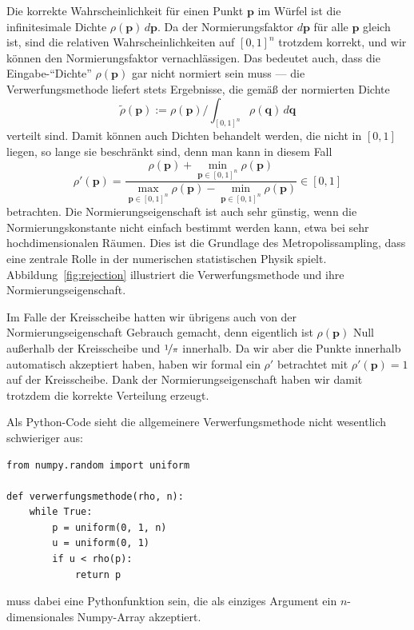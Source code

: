 Die korrekte Wahrscheinlichkeit für einen Punkt $\mathbf p$ im Würfel
ist die infinitesimale Dichte $\rho(\mathbf p)\,d\mathbf p$. Da der
Normierungsfaktor $d\mathbf p$ für alle $\mathbf p$ gleich ist, sind
die relativen Wahrscheinlichkeiten auf $[0,1]^n$ trotzdem korrekt, und
wir können den Normierungsfaktor vernachlässigen. Das bedeutet auch,
dass die Eingabe-"`Dichte"' $\rho(\mathbf p)$ gar nicht normiert sein
muss --- die Verwerfungsmethode liefert stets Ergebnisse, die gemäß
der normierten Dichte
\begin{equation}
  \tilde\rho(\mathbf p) := \rho(\mathbf p) / \int_{[0,1]^n} \rho(\mathbf q)\,d\mathbf q
\end{equation}
verteilt sind. Damit können auch Dichten behandelt werden, die nicht
in $[0,1]$ liegen, so lange sie beschränkt sind, denn man kann in
diesem Fall
\begin{equation}
  \rho'(\mathbf p) = \frac{\rho(\mathbf p) + \min_{\mathbf p\in [0,1]^n} \rho(\mathbf p)}{
    \max_{\mathbf p\in [0,1]^n} \rho(\mathbf p) - \min_{\mathbf p\in [0,1]^n} \rho(\mathbf p)} \in [0,1]
\end{equation}
betrachten. Die Normierungseigenschaft ist auch sehr günstig, wenn die
Normierungskonstante nicht einfach bestimmt werden kann, etwa bei sehr
hochdimensionalen Räumen. Dies ist die Grundlage des
Metropolissampling, dass eine zentrale Rolle in der numerischen
statistischen Physik spielt. Abbildung~\ref{fig:rejection} illustriert
die Verwerfungsmethode und ihre Normierungseigenschaft.

Im Falle der Kreisscheibe hatten wir übrigens auch von der
Normierungseigenschaft Gebrauch gemacht, denn eigentlich ist $\rho(\mathbf p)$
Null außerhalb der Kreisscheibe und $\nicefrac{1}{\pi}$ innerhalb. Da
wir aber die Punkte innerhalb automatisch akzeptiert haben, haben wir
formal ein $\rho'$ betrachtet mit $\rho'(\mathbf p) = 1$ auf der
Kreisscheibe. Dank der Normierungseigenschaft haben wir damit trotzdem
die korrekte Verteilung erzeugt.

Als Python-Code sieht die allgemeinere Verwerfungsmethode nicht
wesentlich schwieriger aus:
\begin{lstlisting}
from numpy.random import uniform

def verwerfungsmethode(rho, n):
    while True:
        p = uniform(0, 1, n)
        u = uniform(0, 1)
        if u < rho(p):
            return p
\end{lstlisting}
 muss dabei eine Pythonfunktion sein, die als einziges
Argument ein $n$-dimensionales Numpy-Array akzeptiert.

